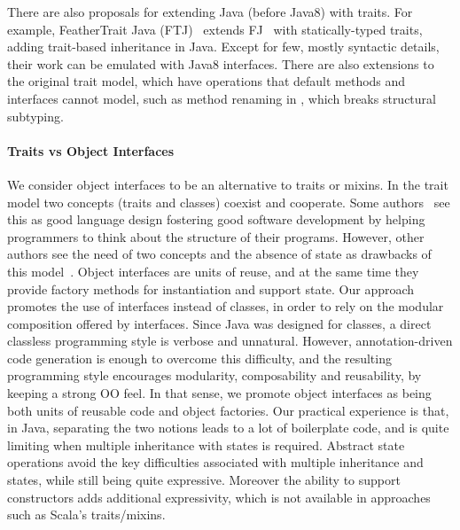 There are also proposals for extending Java (before Java8) with traits. For
example, FeatherTrait Java (FTJ)~\cite{Liquori08ftj} extends
FJ~\cite{Igarashi01FJ} with statically-typed traits, adding trait-based
inheritance in Java.  Except for few, mostly syntactic details, their work can
be emulated with Java8 interfaces. There are also extensions to the original
trait model, which have operations that default methods and interfaces cannot
model, such as method renaming in \cite{reppy2006foundation}, which breaks
structural subtyping.

\paragraph{Traits vs Object Interfaces}
We consider object interfaces to be an alternative to traits or mixins.  In the
trait model two concepts (traits and classes) coexist and cooperate. Some
authors~\cite{BettiniDSS13} see this as good language design fostering good
software development by helping programmers to think about the structure of
their programs.  However, other authors see the need of two concepts and the
absence of state as drawbacks of this model~\cite{malayeri2009cz}.  Object
interfaces are units of reuse, and at the same time they provide factory methods
for instantiation and support state.  Our approach promotes the use of
interfaces instead of classes, in order to rely on the modular composition
offered by interfaces. Since Java was designed for classes, a direct classless
programming style is verbose and unnatural. However, annotation-driven code
generation is enough to overcome this difficulty, and the resulting programming
style encourages modularity, composability and reusability, by keeping a strong
OO feel. In that sense, we promote object interfaces as being both units of
reusable code and object factories. Our practical experience is that, in Java,
separating the two notions leads to a lot of boilerplate code, and is quite
limiting when multiple inheritance with states is required.  Abstract state
operations avoid the key difficulties associated with multiple inheritance and
states, while still being quite expressive.  Moreover the ability to support
constructors adds additional expressivity, which is not available in approaches
such as Scala's traits/mixins.


